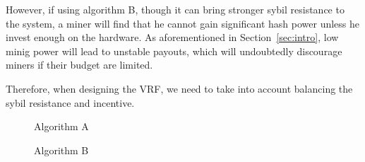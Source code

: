 However, if using algorithm B, though it can bring stronger sybil resistance to the system, a miner will find that he cannot gain significant hash power unless he invest enough on the hardware.
As aforementioned in Section~\ref{sec:intro}, low minig power will lead to unstable payouts, which will undoubtedly discourage miners if their budget are limited.

Therefore, when designing the VRF, we need to take into account balancing the sybil resistance and incentive.

\begin{figure}
\centering
{}
\caption{Algorithm A}
\label{fig:algo_A}
\end{figure}


\begin{figure}
\centering
{}
\caption{Algorithm B}
\label{fig:algo_B}
\end{figure}
